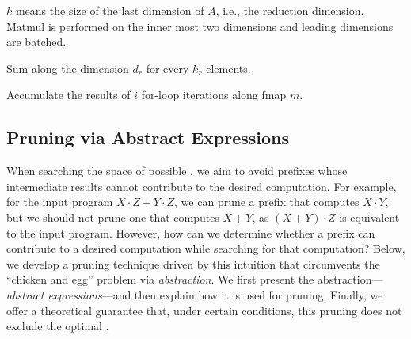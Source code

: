 \begin{table}
{\begin{threeparttable}
\begin{tablenotes}
    \item[1] $k$ means the size of the last dimension of $A$, i.e., the reduction dimension. Matmul is performed on the inner most two dimensions and leading dimensions are batched.
    \item[2] Sum along the dimension $d_r$ for every $k_r$ elements.
    \item[3] Accumulate the results of $i$ for-loop iterations along fmap $m$.
    \end{tablenotes}
    \end{threeparttable}
    }
    \vspace{\captionvspace}
\end{table}




\subsection{Pruning via Abstract Expressions}
\label{subsec:abstract_expression}



When searching the space of possible \graphs, we aim to avoid \graph prefixes whose intermediate results cannot contribute to the desired computation.
For example, for the input program $X \cdot Z + Y \cdot Z$,
we can prune a prefix that computes $X \cdot Y$, but we should not prune one that computes $X + Y$, as $(X+Y) \cdot Z$ is equivalent to the input program.
However, how can we determine whether a prefix can contribute to a desired computation while searching for that computation?
Below, we develop a pruning technique driven by this intuition that circumvents the ``chicken and egg'' problem via \emph{abstraction}.
We first present the abstraction---\emph{abstract expressions}---and then explain how it is used for pruning.
Finally, we offer a theoretical guarantee that, under certain conditions, this pruning does not exclude the optimal \graph.

